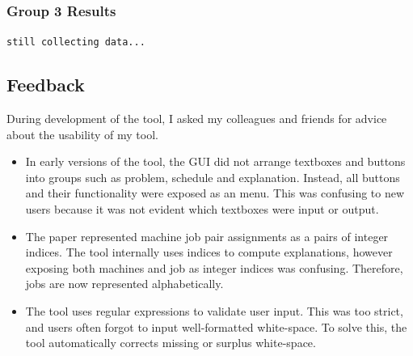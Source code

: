 \subsubsection{Group 3 Results}

\verb|still collecting data...|

\subsection{Feedback}

During development of the tool, I asked my colleagues and friends for advice about the usability of my tool.

\begin{itemize}
	\item In early versions of the tool, the GUI did not arrange textboxes and buttons into groups such as problem, schedule and explanation. Instead, all buttons and their functionality were exposed as an menu. This was confusing to new users because it was not evident which textboxes were input or output.
	\item The paper \cite{aes} represented machine job pair assignments as a pairs of integer indices. The tool internally uses indices to compute explanations, however exposing both machines and job as integer indices was confusing. Therefore, jobs are now represented alphabetically.
	\item The tool uses regular expressions to validate user input. This was too strict, and users often forgot to input well-formatted white-space. To solve this, the tool automatically corrects missing or surplus white-space.
\end{itemize}